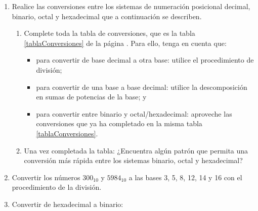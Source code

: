 \documentclass[12pt]{article}
\begin{document}
\begin{enumerate}[resume]

    \item Realice las conversiones entre los sistemas de numeración posicional          
          decimal, binario, octal y hexadecimal que a continuación se describen.
    
        \begin{enumerate}
        
        		\item Complete toda la tabla de conversiones, que es la 
              	  tabla \ref{tablaConversiones} de la 
              	  página \pageref{tablaConversiones}. \label{ejTabla} 
              	  Para ello, tenga en cuenta que:
          \begin{itemize}
             \item para convertir de base decimal a otra base: utilice el
        			   procedimiento de división;
           	\item para convertir de una base a base decimal:
        			  utilice la descomposición en sumas de potencias de la base; y 
        		\item para convertir entre binario y octal/hexadecimal: aproveche las
        			  conversiones que ya ha completado en la misma 
        			  tabla \ref{tablaConversiones}.
          \end{itemize}

            \item Una vez completada la tabla: ¿Encuentra algún patrón que
                permita una conversión más rápida entre los sistemas binario,
                octal y hexadecimal?

        \end{enumerate}
\item Convertir los números $300_{10}$ y $5984_{10}$ a las bases 3, 5, 8, 12, 14 y 16 con el procedimiento de la división.
    \item Convertir de hexadecimal a binario:

\end{enumerate}
\end{document}
